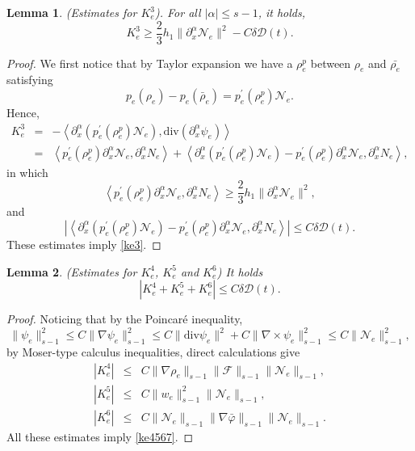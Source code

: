 \documentclass[reqno,twoside,12pt,a4paper]{amsart}
\newcommand{\al}{\alpha}
\newcommand{\dive}{\mathrm{div}}
\newcommand{\pa}{\partial}
\newcommand{\D}{\nabla}
\newcommand{\vp}{\varphi}
\newcommand{\calf}{\mathcal{F}}
\newcommand{\Ne}{\mathcal{N}_e}
\newtheorem{lemma}{Lemma}[section]
\numberwithin{equation}{section}
\begin{document}
\begin{lemma}\label{lem3}(Estimates for $K_e^3$). For all $|\al|\leq s-1$, it holds,
\begin{equation}\label{ke3}
    K_e^3\geq \dfrac{2}{3}h_1\|\pa_x^\al \Ne\|^2-C\delta\mathcal{D}(t).
\end{equation}
\end{lemma}
\begin{proof} We first notice that by Taylor expansion we have a $\rho_e^p$ between $\rho_e$ and $\bar{\rho_e}$ satisfying
\[
p_e(\rho_e)-p_e(\bar{\rho}_e)=p^\prime_e(\rho_e^p) \Ne.
\]
Hence, 
\begin{eqnarray}
K_e^3 &=& -\left\langle \partial^\al_x (p^\prime_e(\rho_e^p) \Ne),\dive(\partial^\al_x \psi_e) \right\rangle\nonumber\\
&=& \left<p^\prime_e(\rho_e^p)\pa_x^\al \Ne, \pa_x^\al N_e\right>+\left<\partial^\al_x (p^\prime_e(\rho_e^p) \Ne)-p^\prime_e(\rho_e^p)\pa_x^\al \Ne, \pa_x^\al N_e\right>,\nonumber
\end{eqnarray}
in which
\[
\left<p^\prime_e(\rho_e^p)\pa_x^\al \Ne, \pa_x^\al N_e\right>\geq \dfrac{2}{3}h_1\|\pa_x^\al \Ne\|^2,
\]
and
\[
\left|\left<\partial^\al_x (p^\prime_e(\rho_e^p) \Ne)-p^\prime_e(\rho_e^p)\pa_x^\al \Ne, \pa_x^\al N_e\right>\right|\leq C\delta\mathcal{D}(t).
\]
These estimates imply \eqref{ke3}. 
\end{proof}

\begin{lemma}\label{lem4567}(Estimates for $K_e^4$, $K_e^5$ and $K_e^6$) It holds
\begin{equation}\label{ke4567}
    |K_e^4+K_e^5+K_e^6|\leq C\delta\mathcal{D}(t).
\end{equation}
\end{lemma}
\begin{proof} Noticing that by the Poincar\'e inequality, 
\[
\|\psi_e\|_{s-1}^2\leq C\|\D \psi_e\|_{s-1}^2\leq C\|\dive \psi_e\|^2+C\|\D\times \psi_e\|_{s-1}^2\leq C\|\Ne\|_{s-1}^2,
\]
by Moser-type calculus inequalities, direct calculations give
\begin{eqnarray*}
|K_e^4|&\leq& C\|\D \rho_e\|_{s-1}\|\calf\|_{s-1}\|\Ne\|_{s-1},\\
|K_e^5|&\leq& C\|w_e\|_{s-1}^2\|\Ne\|_{s-1},\\
|K_e^6|&\leq& C\|\Ne\|_{s-1}\|\D\bar{\vp}\|_{s-1}\|\Ne\|_{s-1}.
\end{eqnarray*}
All these estimates imply \eqref{ke4567}.
\end{proof}
\end{document}

